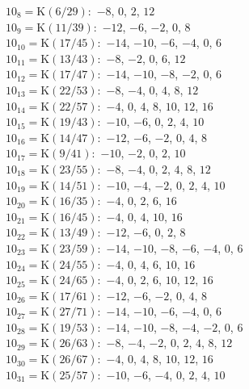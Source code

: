 $10_{8} = \mathrm{K}(6/29):$  $-8$, $0$, $2$, $12$\\ 
$10_{9} = \mathrm{K}(11/39):$  $-12$, $-6$, $-2$, $0$, $8$\\ 
$10_{10} = \mathrm{K}(17/45):$  $-14$, $-10$, $-6$, $-4$, $0$, $6$\\ 
$10_{11} = \mathrm{K}(13/43):$  $-8$, $-2$, $0$, $6$, $12$\\ 
$10_{12} = \mathrm{K}(17/47):$  $-14$, $-10$, $-8$, $-2$, $0$, $6$\\ 
$10_{13} = \mathrm{K}(22/53):$  $-8$, $-4$, $0$, $4$, $8$, $12$\\ 
$10_{14} = \mathrm{K}(22/57):$  $-4$, $0$, $4$, $8$, $10$, $12$, $16$\\ 
$10_{15} = \mathrm{K}(19/43):$  $-10$, $-6$, $0$, $2$, $4$, $10$\\ 
$10_{16} = \mathrm{K}(14/47):$  $-12$, $-6$, $-2$, $0$, $4$, $8$\\ 
$10_{17} = \mathrm{K}(9/41):$  $-10$, $-2$, $0$, $2$, $10$\\ 
$10_{18} = \mathrm{K}(23/55):$  $-8$, $-4$, $0$, $2$, $4$, $8$, $12$\\ 
$10_{19} = \mathrm{K}(14/51):$  $-10$, $-4$, $-2$, $0$, $2$, $4$, $10$\\ 
$10_{20} = \mathrm{K}(16/35):$  $-4$, $0$, $2$, $6$, $16$\\ 
$10_{21} = \mathrm{K}(16/45):$  $-4$, $0$, $4$, $10$, $16$\\ 
$10_{22} = \mathrm{K}(13/49):$  $-12$, $-6$, $0$, $2$, $8$\\ 
$10_{23} = \mathrm{K}(23/59):$  $-14$, $-10$, $-8$, $-6$, $-4$, $0$, $6$\\ 
$10_{24} = \mathrm{K}(24/55):$  $-4$, $0$, $4$, $6$, $10$, $16$\\ 
$10_{25} = \mathrm{K}(24/65):$  $-4$, $0$, $2$, $6$, $10$, $12$, $16$\\ 
$10_{26} = \mathrm{K}(17/61):$  $-12$, $-6$, $-2$, $0$, $4$, $8$\\ 
$10_{27} = \mathrm{K}(27/71):$  $-14$, $-10$, $-6$, $-4$, $0$, $6$\\ 
$10_{28} = \mathrm{K}(19/53):$  $-14$, $-10$, $-8$, $-4$, $-2$, $0$, $6$\\ 
$10_{29} = \mathrm{K}(26/63):$  $-8$, $-4$, $-2$, $0$, $2$, $4$, $8$, $12$\\ 
$10_{30} = \mathrm{K}(26/67):$  $-4$, $0$, $4$, $8$, $10$, $12$, $16$\\ 
$10_{31} = \mathrm{K}(25/57):$  $-10$, $-6$, $-4$, $0$, $2$, $4$, $10$\\ 

